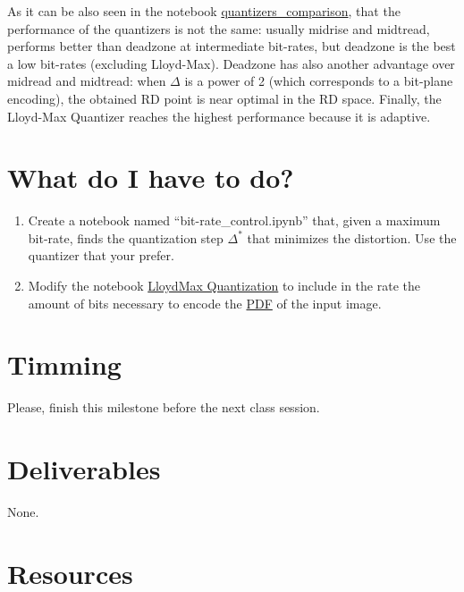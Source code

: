 As it can be also seen in the notebook
\href{https://github.com/Sistemas-Multimedia/Sistemas-Multimedia.github.io/blob/master/contents/scalar_quantization/compare_quantizers.ipynb}{quantizers\_comparison},
that the performance of the quantizers is not the same: usually
midrise and midtread, performs better than deadzone at intermediate
bit-rates, but deadzone is the best a low bit-rates (excluding
Lloyd-Max). Deadzone has also another advantage over midread and
midtread: when $\Delta$ is a power of 2 (which corresponds to a
bit-plane encoding), the obtained RD point is near optimal in the RD
space. Finally, the Lloyd-Max Quantizer reaches the highest
performance because it is adaptive.



\section{What do I have to do?}

\begin{enumerate}
\item Create a notebook named ``bit-rate\_control.ipynb'' that, given
  a maximum bit-rate, finds the quantization step $\Delta^*$ that
  minimizes the distortion. Use the quantizer that your prefer.
\item Modify the notebook
  \href{https://github.com/Sistemas-Multimedia/Sistemas-Multimedia.github.io/blob/master/contents/scalar_quantization/LloydMax.ipynb}{LloydMax
    Quantization} to include in the rate the amount of bits necessary
  to encode the
  \href{https://en.wikipedia.org/wiki/Probability_density_function}{PDF}
  of the input image.
\end{enumerate}


\section{Timming}

Please, finish this milestone before the next class session.

\section{Deliverables}

None.

\section{Resources}

\renewcommand{\addcontentsline}[3]{} %

